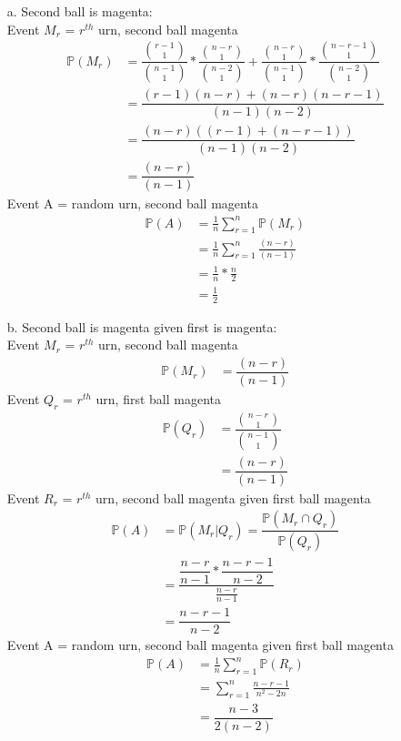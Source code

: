 \documentclass{article}
\begin{document}
\begin{enumerate}
    \item[a.] Second ball is magenta: \\
        Event $M_r$ = $r^{th}$ urn, second ball magenta
        \begin{align*}
            \mathbb{P}(M_r) &= \dfrac{\binom{r-1}{1}}{\binom{n-1}{1}} * \dfrac{\binom{n-r}{1}}{\binom{n-2}{1}} + \dfrac{\binom{n-r}{1}}{\binom{n-1}{1}} * \dfrac{\binom{n-r-1}{1}}{\binom{n-2}{1}} \\
            &= \dfrac{(r-1)(n-r) + (n-r)(n-r-1)}{(n-1)(n-2)} \\
            &= \dfrac{(n-r)((r-1)+(n-r-1))}{(n-1)(n-2)} \\
            &= \dfrac{(n-r)}{(n-1)}
        \end{align*}
        Event A = random urn, second ball magenta
        \begin{align*}
            \mathbb{P}(A) &= \frac{1}{n}\sum\limits_{r=1}^{n}\mathbb{P}(M_r) \\
            &= \frac{1}{n}\sum\limits_{r=1}^{n}\frac{(n-r)}{(n-1)} \\
            &= \frac{1}{n} * \frac{n}{2} \\
            &= \frac{1}{2}
        \end{align*}
    \item[b.] Second ball is magenta given first is magenta: \\
        Event $M_r$ = $r^{th}$ urn, second ball magenta
        \begin{align*}
            \mathbb{P}(M_r) &= \dfrac{(n-r)}{(n-1)}
        \end{align*}
        Event $Q_r$ = $r^{th}$ urn, first ball magenta
        \begin{align*}
            \mathbb{P}(Q_r) &= \dfrac{\binom{n-r}{1}}{\binom{n-1}{1}} \\
            &= \dfrac{(n-r)}{(n-1)}
        \end{align*}
        Event $R_r$ = $r^{th}$ urn, second ball magenta given first ball magenta
        \begin{align*}
            \mathbb{P}(A) &= \mathbb{P}(M_r|Q_r) = \dfrac{\mathbb{P}(M_r \cap Q_r)}{\mathbb{P}(Q_r)} \\
            &= \dfrac{\dfrac{n-r}{n-1} * \dfrac{n-r-1}{n-2}}{\frac{n-r}{n-1}} \\
            &= \dfrac{n-r-1}{n-2}
        \end{align*}
        Event A = random urn, second ball magenta given first ball magenta
        \begin{align*}
            \mathbb{P}(A) &= \frac{1}{n}\sum\limits_{r=1}^{n}\mathbb{P}(R_r) \\
            &= \sum\limits_{r=1}^{n}\frac{n-r-1}{n^2-2n} \\
            &= \dfrac{n-3}{2(n-2)}
        \end{align*}
\end{enumerate}
\end{document}
